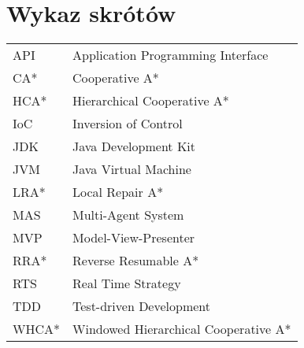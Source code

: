 \chapter*{Wykaz skrótów}

\begin{tabular}{l l}
API & Application Programming Interface \\
CA* & Cooperative A* \\
HCA* & Hierarchical Cooperative A* \\
IoC & Inversion of Control \\
JDK & Java Development Kit \\
JVM & Java Virtual Machine \\
LRA* & Local Repair A* \\
MAS & Multi-Agent System \\
MVP & Model-View-Presenter \\
RRA* & Reverse Resumable A* \\
RTS & Real Time Strategy \\
TDD & Test-driven Development \\
WHCA* & Windowed Hierarchical Cooperative A* \\

\end{tabular}
